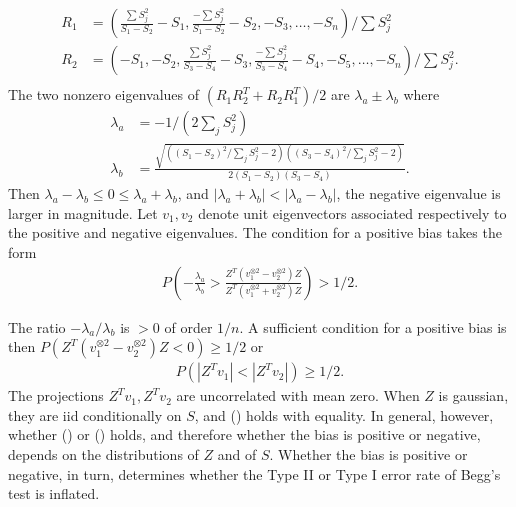 \documentclass[12pt]{article}
\renewcommand{\P}{P}
\newcommand{\z}{Z}
\newcommand{\s}{S}
\newcommand{\Svec}{R}
\newcommand{\eval}{\lambda}
\newcommand{\evec}{v}
\begin{document}
      \begin{align}
        \Svec_1&=\left(\frac{\sum\s_j^2}{\s_1-\s_2}-\s_1, \frac{-\sum\s_j^2}{\s_1-\s_2}-\s_2,-\s_3,\ldots,-\s_n\right)/ \sum\s_j^2  \\
        \Svec_2&=\left(-\s_1,-\s_2,\frac{\sum \s_j^2}{\s_3-\s_4}-\s_3, \frac{-\sum \s_j^2}{\s_3-\s_4}-\s_4,-\s_5,\ldots,-\s_n\right)/ \sum \s_j^2.\\
      \end{align}
      The two nonzero eigenvalues of $(\Svec_1\Svec_2^T+\Svec_2\Svec_1^T)/2$ are $\eval_a\pm\eval_b$ where
      \begin{align}
        \eval_a&=-1/(2\sum_j\s_j^2)\\
        \eval_b&=\frac{\sqrt{((\s_1-\s_2)^2/\sum_j\s_j^2-2)((\s_3-\s_4)^2/\sum_j\s_j^2-2)}}{2(\s_1-\s_2)(\s_3-\s_4)}.
      \end{align}
      Then $\eval_a-\eval_b\le 0 \le \eval_a+\eval_b$, and
      $|\eval_a+\eval_b|<|\eval_a-\eval_b|$, the negative eigenvalue
      is larger in magnitude. Let $\evec_1,\evec_2$ denote unit
      eigenvectors associated respectively to the positive and
      negative eigenvalues. The condition for a positive bias takes the form
      \begin{align}
        \P\left( -\frac{\eval_a}{\eval_b} > \frac{\z^T(\evec_1^{\otimes 2}-\evec_2^{\otimes 2})\z}{\z^T(\evec_1^{\otimes 2}+\evec_2^{\otimes 2})\z} \right) > 1/2.\label{eqn:iff_cond}
      \end{align}

      The ratio $-\eval_a/\eval_b$ is $>0$ of order $1/n$. A
      sufficient condition for a positive bias is then
      $\P(\z^T(\evec_1^{\otimes 2}-\evec_2^{\otimes 2})\z<0)\ge 1/2$
      or
      \begin{align}
        \P(|\z^T\evec_1|<|\z^T\evec_2|)\ge 1/2.\label{eqn:suff_cond}
      \end{align}
      The projections $\z^T\evec_1,\z^T\evec_2$ are uncorrelated with
      mean zero. When $\z$ is gaussian, they are iid conditionally on
      $\s$, and () holds with equality. In
      general, however, whether () or
      () holds, and therefore whether the bias is
      positive or negative, depends on the distributions of $\z$ and
      of $\s$. Whether the bias is positive or negative, in turn,
      determines whether the Type II or Type I error rate of Begg's
      test is inflated. %
      
\end{document}
